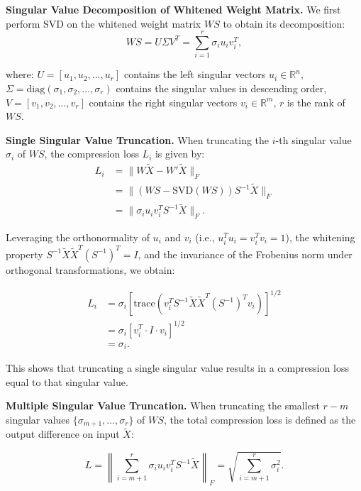 \documentclass[11pt]{article}
\begin{document}
\textbf{Singular Value Decomposition of Whitened Weight Matrix.} We first perform SVD on the whitened weight matrix \( W S \) to obtain its decomposition:
\begin{equation}
W S = U \Sigma V^T = \sum_{i=1}^r \sigma_i u_i v_i^T,
\end{equation}

where: \( U = [u_1, u_2, ..., u_r] \) contains the left singular vectors \( u_i \in \mathbb{R}^n \), \( \Sigma = \text{diag}(\sigma_1, \sigma_2, ..., \sigma_r) \) contains the singular values in descending order, \( V = [v_1, v_2, ..., v_r] \) contains the right singular vectors \( v_i \in \mathbb{R}^m \), \( r \) is the rank of \( W S \).


\textbf{Single Singular Value Truncation.} When truncating the \( i \)-th singular value \( \sigma_i \) of \( W S \), the compression loss \( L_i \) is given by:
\begin{equation}
\begin{aligned}
L_i &= \|W \tilde{X} - W' \tilde{X}\|_F \\
    &= \|(W S - \text{SVD}(W S)) S^{-1} \tilde{X}\|_F \\
    &= \|\sigma_i u_i v_i^T S^{-1} \tilde{X}\|_F.
\end{aligned}
\end{equation}

Leveraging the orthonormality of \( u_i \) and \( v_i \) (i.e., \( u_i^T u_i = v_i^T v_i = 1 \)), the whitening property \( S^{-1} \tilde{X} \tilde{X}^T (S^{-1})^T = I \), and the invariance of the Frobenius norm under orthogonal transformations, we obtain: 
\begin{small} 
\begin{equation}
\begin{aligned}
L_i &= \sigma_i \left[\text{trace}\left(v_i^T S^{-1} \tilde{X} \tilde{X}^T (S^{-1})^T v_i\right)\right]^{1/2} \\
&= \sigma_i \left[v_i^T \cdot I \cdot v_i\right]^{1/2} \\
&= \sigma_i.
\end{aligned}
\end{equation}
\end{small} 

This shows that truncating a single singular value results in a compression loss equal to that singular value.

\textbf{Multiple Singular Value Truncation.}
When truncating the smallest \( r - m \) singular values \( \{\sigma_{m+1}, \dots, \sigma_r\} \) of \( W S \), the total compression loss is defined as the output difference on input \( \tilde{X} \):
\begin{small} 
\begin{equation}
L = \left\| \sum_{i=m+1}^r \sigma_i u_i v_i^T S^{-1} \tilde{X} \right\|_F 
  = \sqrt{ \sum_{i=m+1}^r \sigma_i^2 }.
\end{equation}
\end{small} 
\end{document}

